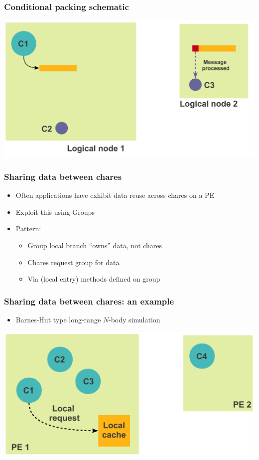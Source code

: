 \begin{frame}[fragile]
  \frametitle{Conditional packing schematic}
  \includegraphics[width=\textwidth]{figures/advancedOpts/fig3_2}
\end{frame}

\begin{frame}[fragile]
  \frametitle{Sharing data between chares}
  \begin{itemize}
  \item Often applications have exhibit data reuse across chares on a PE
  \item Exploit this using Groups
  \item Pattern:
    \begin{itemize}
    \item Group local branch “owns” data, not chares
    \item Chares request group for data
    \item Via (local entry) methods defined on group
    \end{itemize}
  \end{itemize}
\end{frame}

\begin{frame}[fragile]
  \frametitle{Sharing data between chares: an example}
  \begin{itemize}
    \item Barnes-Hut type long-range $N$-body simulation
  \end{itemize}
  \includegraphics[width=\textwidth]{figures/advancedOpts/fig4}
\end{frame}

